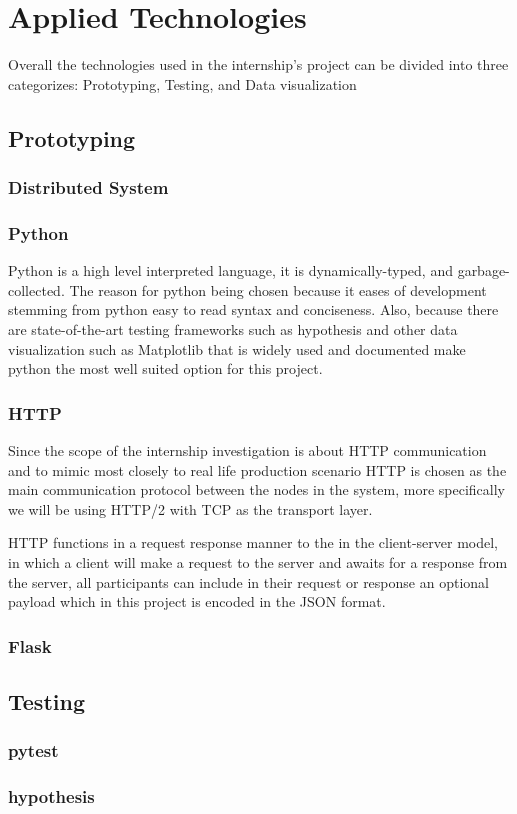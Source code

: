 \chapter{\centering Applied Technologies}

Overall the technologies used in the internship's project can be divided into
three categorizes: Prototyping, Testing, and Data visualization

\section{Prototyping}

\subsection{Distributed System}


\subsection{Python}
Python is a high level interpreted language, it is dynamically-typed, and garbage-collected.
The reason for python being chosen because it eases of development stemming from 
python easy to read syntax and conciseness. Also, because there are state-of-the-art
testing frameworks such as hypothesis and other data visualization such as Matplotlib
that is widely used and documented make python the most well suited option for 
this project.


\subsection{HTTP}
Since the scope of the internship investigation is about HTTP communication and to mimic 
most closely to real life production scenario HTTP is chosen as the main communication 
protocol between the nodes in the system, more specifically we will be using HTTP/2 with 
TCP as the transport layer.

HTTP functions in a request response manner to the in the client-server model, 
in which a client will make a request to the server and awaits for a response 
from the server, all participants can include in their request or response 
an optional payload which in this project is encoded in the JSON format.

\subsection{Flask}

\section{Testing}

\subsection{pytest}

\subsection{hypothesis}
